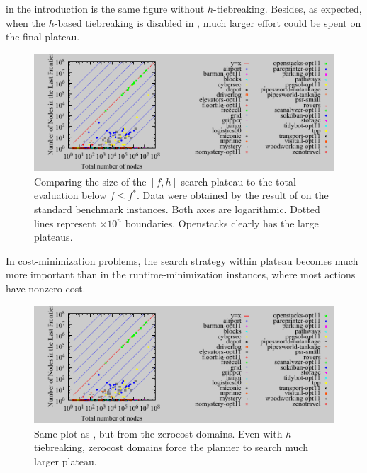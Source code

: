  in the introduction is the same figure without $h$-tiebreaking.
Besides, as expected, when the
$h$-based tiebreaking is disabled in , much
larger effort could be spent on the final plateau.







\begin{figure}[htb]
 \centering {}
  \includegraphics{tables/aaai16-frontier/aaai16prelim3/lmcut_frontier-front.pdf}
  \caption{Comparing the size of the $[f,h]$ search plateau to the total
  evaluation below $f\leq f^*$. Data were obtained by the result of
  \lmcut on the standard benchmark instances. Both axes are
  logarithmic. Dotted lines represent $\times 10^n$ boundaries.
  Openstacks clearly has the large plateaus.}  \label{plateau}
\end{figure}

 In cost-minimization problems, the search
strategy within plateau becomes much more important than in the
runtime-minimization instances, where most actions have nonzero cost.

\begin{figure}[htb]
 \centering {}
  \includegraphics{tables/aaai16-frontier/aaai16prelim3/lmcut_frontier-front.pdf}
  \caption{Same plot as , but from the zerocost
  domains. Even with $h$-tiebreaking, zerocost domains force the planner
  to search much larger plateau.}
 \label{plateau-zerocost}
\end{figure}

